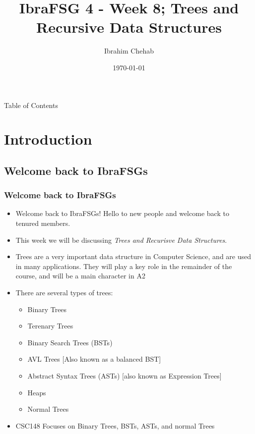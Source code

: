 \documentclass[hyperref={colorlinks,citecolor=blue,linkcolor=blue,urlcolor=blue}, aspectratio=1610]{beamer}
\title[IbraFSG 4: Trees and Recursion]{IbraFSG\texttrademark{} 4 - Week 8; Trees and Recursive Data Structures}
\author{Ibrahim Chehab}
\institute{UTM RGASC}
\date{\today}
\begin{document}
\begin{frame}
  \titlepage
\end{frame}

\begin{frame}{Table of Contents}
  \tableofcontents
\end{frame}

\section{Introduction}

\subsection{Welcome back to IbraFSGs\texttrademark{}}
\begin{frame}
  \frametitle{Welcome back to IbraFSGs\texttrademark{}}
  \begin{itemize}
  \item Welcome back to IbraFSGs\texttrademark{}! Hello to new people and welcome back to tenured members.
  \item This week we will be discussing \textit{Trees and Recurisve Data Structures}.
  \item Trees are a very important data structure in Computer Science, and are used in many applications. They will play a key role in the remainder of the course, and will be a main character in A2
  \item There are several types of trees:
  \begin{itemize}
    \item Binary Trees
    \item Terenary Trees
    \item Binary Search Trees (BSTs)
    \item AVL Trees [Also known as a balanced BST]
    \item Abstract Syntax Trees (ASTs) [also known as Expression Trees]
    \item Heaps
    \item Normal Trees
  \end{itemize}
  \item CSC148 Focuses on Binary Trees, BSTs, ASTs, and normal Trees
\end{itemize}
\end{frame}
\end{document}
